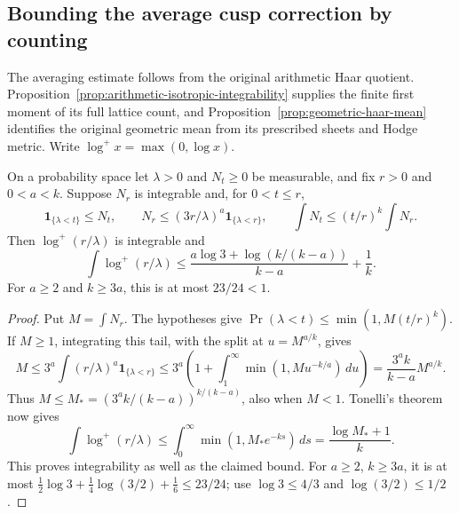 \subsection{Bounding the average cusp correction by counting}
\label{sec:cusp-counting-mean}

The averaging estimate follows from the original arithmetic Haar quotient.
Proposition~\ref{prop:arithmetic-isotropic-integrability} supplies the
finite first moment of its full lattice count, and
Proposition~\ref{prop:geometric-haar-mean} identifies the original
geometric mean from its prescribed sheets and Hodge metric. Write
$\log^+x=\max(0,\log x)$.

\begin{lemma}\label{lem:cusp-counting-tail}
On a probability space let $\lambda>0$ and $N_t\ge0$ be measurable,
and fix $r>0$ and $0<a<k$. Suppose $N_r$ is integrable and, for
$0<t\le r$,
\[
 \mathbf1_{\{\lambda<t\}}\le N_t,\qquad
 N_r\le(3r/\lambda)^a\mathbf1_{\{\lambda<r\}},\qquad
 \int N_t\le(t/r)^k\int N_r.
\]
Then $\log^+(r/\lambda)$ is integrable and
\[
 \int\log^+(r/\lambda)
 \le\frac{a\log3+\log(k/(k-a))}{k-a}+\frac1k.
\]
For $a\ge2$ and $k\ge3a$, this is at most $23/24<1$.
\end{lemma}

\begin{proof}
Put $M=\int N_r$. The hypotheses give
$\Pr(\lambda<t)\le\min(1,M(t/r)^k)$. If $M\ge1$, integrating this
tail, with the split at $u=M^{a/k}$, gives
\[
 M\le3^a\int(r/\lambda)^a\mathbf1_{\{\lambda<r\}}
 \le3^a\left(1+\int_1^\infty\min(1,Mu^{-k/a})\,du\right)
 =\frac{3^ak}{k-a}M^{a/k}.
\]
Thus $M\le M_*=(3^ak/(k-a))^{k/(k-a)}$, also when $M<1$.
Tonelli's theorem now gives
\[
 \int\log^+(r/\lambda)
 \le\int_0^\infty\min(1,M_*e^{-ks})\,ds
 =\frac{\log M_*+1}{k}.
\]
This proves integrability as well as the claimed bound. For $a\ge2$,
$k\ge3a$, it is at most
$\frac12\log3+\frac14\log(3/2)+\frac16\le23/24$;
use $\log3\le4/3$ and $\log(3/2)\le1/2$.
\end{proof}


